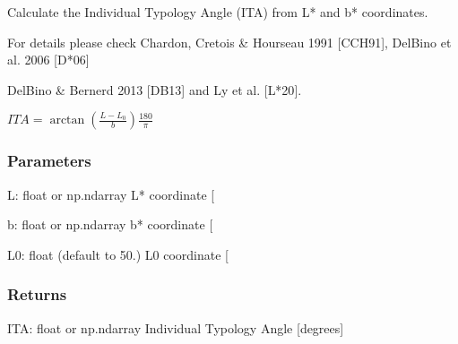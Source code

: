 \documentclass[letterpaper,10pt,english]{sphinxmanual}
\begin{document}
\begin{fulllineitems}
\label{\detokenize{07_colors:skinoptics.colors.ITA}}
\pysigstartsignatures
{}
\pysigstopsignatures
\begin{DUlineblock}{0em}
\item[] Calculate the Individual Typology Angle (ITA) from L* and b* coordinates.
\item[] For details please check Chardon, Cretois \& Hourseau 1991 {[}CCH91{]}, DelBino et al. 2006 {[}D*06{]}
\item[] DelBino \& Bernerd 2013 {[}DB13{]} and Ly et al. {[}L*20{]}.
\end{DUlineblock}

\sphinxAtStartPar
\(ITA = \arctan\left(\frac{L-L_0}{b}\right)\frac{180}{\pi}\)


\subsubsection{Parameters}
\label{\detokenize{07_colors:id9}}
\sphinxAtStartPar
L: float or np.ndarray
L* coordinate {[}\sphinxhyphen{}{]}

\sphinxAtStartPar
b: float or np.ndarray
b* coordinate {[}\sphinxhyphen{}{]}

\sphinxAtStartPar
L0: float (default to 50.)
L0 coordinate {[}\sphinxhyphen{}{]}


\subsubsection{Returns}
\label{\detokenize{07_colors:id10}}
\sphinxAtStartPar
ITA: float or np.ndarray 
Individual Typology Angle {[}degrees{]}

\end{fulllineitems}

\end{document}
